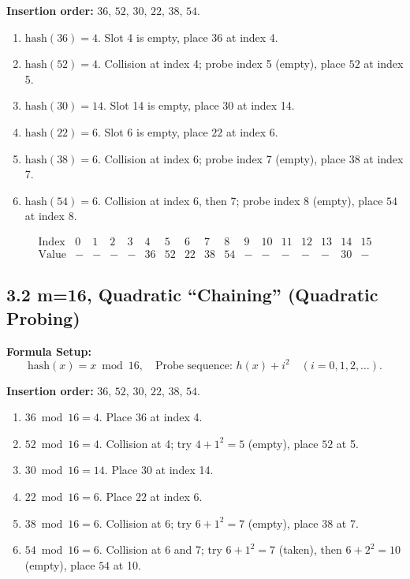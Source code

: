 \documentclass[12pt]{article}
\begin{document}
	\noindent
	\textbf{Insertion order:} \(36,\,52,\,30,\,22,\,38,\,54\). 
	\begin{enumerate}
		\item \(\text{hash}(36) = 4\). Slot 4 is empty, place \(36\) at index 4.
		\item \(\text{hash}(52) = 4\). Collision at index 4; probe index 5 (empty), place \(52\) at index 5.
		\item \(\text{hash}(30) = 14\). Slot 14 is empty, place \(30\) at index 14.
		\item \(\text{hash}(22) = 6\). Slot 6 is empty, place \(22\) at index 6.
		\item \(\text{hash}(38) = 6\). Collision at index 6; probe index 7 (empty), place \(38\) at index 7.
		\item \(\text{hash}(54) = 6\). Collision at index 6, then 7; probe index 8 (empty), place \(54\) at index 8.
	\end{enumerate}
	
	\[
	\begin{array}{c|cccccccccccccccc}
		\text{Index} & 0 & 1 & 2 & 3 & 4 & 5 & 6 & 7 & 8 & 9 & 10 & 11 & 12 & 13 & 14 & 15 \\
		\hline
		\text{Value} & - & - & - & - & 36 & 52 & 22 & 38 & 54 & - & - & - & - & - & 30 & -
	\end{array}
	\]
	
	\subsection*{3.2 m=16, Quadratic ``Chaining'' (Quadratic Probing)}
	\noindent
	\textbf{Formula Setup:} 
	\[
	\text{hash}(x) = x \bmod 16, 
	\quad 
	\text{Probe sequence: } h(x) + i^2 \quad (i = 0,1,2,\dots).
	\]
	
	\noindent
	\textbf{Insertion order:} \(36,\,52,\,30,\,22,\,38,\,54\). 
	\begin{enumerate}
		\item \(36 \bmod 16 = 4.\) Place \(36\) at index 4.
		\item \(52 \bmod 16 = 4.\) Collision at 4; try \(4 + 1^2 = 5\) (empty), place \(52\) at 5.
		\item \(30 \bmod 16 = 14.\) Place \(30\) at index 14.
		\item \(22 \bmod 16 = 6.\) Place \(22\) at index 6.
		\item \(38 \bmod 16 = 6.\) Collision at 6; try \(6 + 1^2 = 7\) (empty), place \(38\) at 7.
		\item \(54 \bmod 16 = 6.\) Collision at 6 and 7; try \(6 + 1^2 = 7\) (taken), then \(6 + 2^2 = 10\) (empty), place \(54\) at 10.
	\end{enumerate}
	
\end{document}
